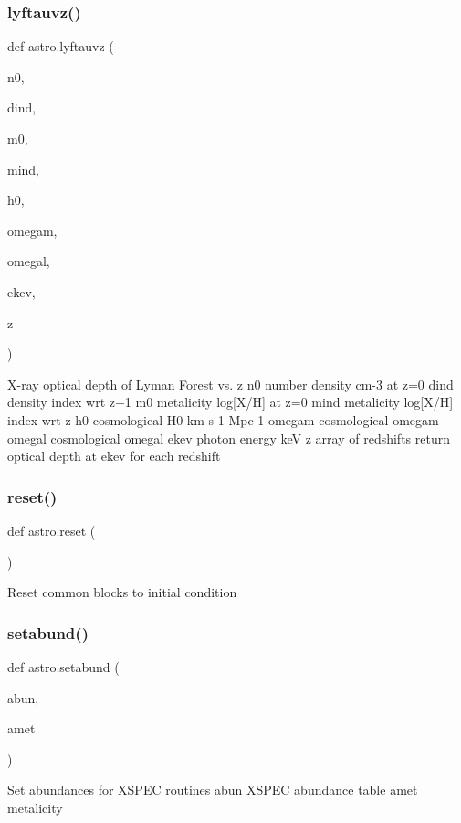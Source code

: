 \subsubsection{\texorpdfstring{lyftauvz()}{lyftauvz()}}
{\footnotesize\ttfamily def astro.\+lyftauvz (\begin{DoxyParamCaption}\item[{}]{n0,  }\item[{}]{dind,  }\item[{}]{m0,  }\item[{}]{mind,  }\item[{}]{h0,  }\item[{}]{omegam,  }\item[{}]{omegal,  }\item[{}]{ekev,  }\item[{}]{z }\end{DoxyParamCaption})}

\begin{DoxyVerb}X-ray optical depth of Lyman Forest vs. z
    n0     number density cm-3 at z=0
    dind   density index wrt z+1
    m0     metalicity log[X/H] at z=0
    mind   metalicity log[X/H] index wrt z
    h0     cosmological H0 km s-1 Mpc-1
    omegam cosmological omegam
    omegal cosmological omegal
    ekev   photon energy keV
    z      array of redshifts
return optical depth at ekev for each redshift
\end{DoxyVerb}
 \mbox{\label{namespaceastro_a65ea3862ae8a5d037c27c686f159c1e0}} 
\subsubsection{\texorpdfstring{reset()}{reset()}}
{\footnotesize\ttfamily def astro.\+reset (\begin{DoxyParamCaption}{ }\end{DoxyParamCaption})}

\begin{DoxyVerb}Reset common blocks to initial condition\end{DoxyVerb}
 \mbox{\label{namespaceastro_af9c1feca763b33c851262015830fc858}} 
\subsubsection{\texorpdfstring{setabund()}{setabund()}}
{\footnotesize\ttfamily def astro.\+setabund (\begin{DoxyParamCaption}\item[{}]{abun,  }\item[{}]{amet }\end{DoxyParamCaption})}

\begin{DoxyVerb}Set abundances for XSPEC routines
    abun   XSPEC abundance table
    amet   metalicity
\end{DoxyVerb}
 